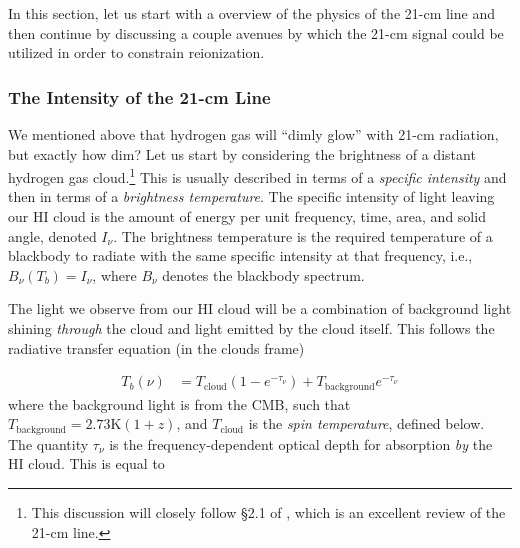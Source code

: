 In this section, let us start with a overview of the physics of the 21-cm line and then continue by discussing a couple avenues by which the 21-cm signal could be utilized in order to constrain reionization. 


\subsubsection{The Intensity of the 21-cm Line}\label{sec:21cmPhysics}


We mentioned above that hydrogen gas will ``dimly glow'' with 21-cm radiation, but exactly how dim? Let us start by considering the brightness of a distant hydrogen gas cloud.\footnote{This discussion will closely follow \S 2.1 of \citealt{Furlanetto2006}, which is an excellent review of the 21-cm line.} This is usually described in terms of a \textit{specific intensity} and then in terms of a \textit{brightness temperature}. The specific intensity of light leaving our HI cloud is the amount of energy per unit frequency, time, area, and solid angle, denoted $I_{\nu}$. The brightness temperature is the required temperature of a blackbody to radiate with the same specific intensity at that frequency, i.e., $B_{\nu}(T_b) = I_{\nu}$, where $B_{\nu}$ denotes the blackbody spectrum. 


The light we observe from our HI cloud will be a combination of background light shining \textit{through} the cloud and light emitted by the cloud itself. This follows the radiative transfer equation (in the clouds frame)

\begin{align}
T_b(\nu) &= T_{\text{cloud}}(1-e^{-\tau_{\nu}}) + T_{\text{background}}e^{-\tau_{\nu}} \label{eq:cloudframe}
\end{align}
where the background light is from the CMB, such that $T_{\text{background}} = 2.73\text{K}(1+z)$, and $T_{\text{cloud}}$ is the \textit{spin temperature}, defined below. The quantity $\tau_{\nu}$ is the frequency-dependent optical depth for absorption \textit{by} the HI cloud. This is equal to 

